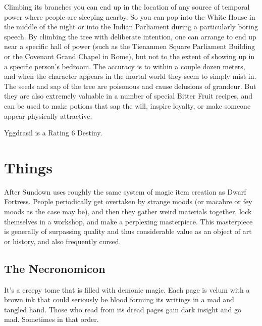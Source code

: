 Climbing its branches you can end up in the location of any source of temporal power where people are sleeping nearby. So you can pop into the White House in the middle of the night or into the Indian Parliament during a particularly boring speech. By climbing the tree with deliberate intention, one can arrange to end up near a specific hall of power (such as the Tienanmen Square Parliament Building or the Covenant Grand Chapel in Rome), but not to the extent of showing up in a specific person's bedroom. The accuracy is to within a couple dozen meters, and when the character appears in the mortal world they seem to simply mist in. The seeds and sap of the tree are poisonous and cause delusions of grandeur. But they are also extremely valuable in a number of special Bitter Fruit recipes, and can be used to make potions that sap the will, inspire loyalty, or make someone appear physically attractive.

Yggdrasil is a Rating 6 Destiny.

\section{Things}

After Sundown uses roughly the same system of magic item creation as Dwarf Fortress. People periodically get overtaken by strange moods (or macabre or fey moods as the case may be), and then they gather weird materials together, lock themselves in a workshop, and make a perplexing masterpiece. This masterpiece is generally of surpassing quality and thus considerable value as an object of art or history, and also frequently cursed.

\subsection{The Necronomicon}
\hspace{\parindent} It's a creepy tome that is filled with demonic magic. Each page is velum with a brown ink that could seriously be blood forming its writings in a mad and tangled hand. Those who read from its dread pages gain dark insight and go mad. Sometimes in that order.

